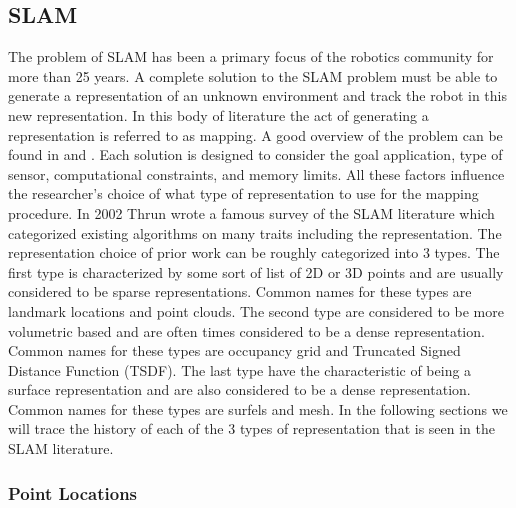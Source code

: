 \subsection{SLAM}

The problem of SLAM has been a primary focus of the robotics community for
more than 25 years. A complete solution to the SLAM problem must be able to
generate a representation of an unknown environment and track the robot in
this new representation. In this body of literature the act of generating a
representation is referred to as mapping. A good overview of the problem
can be found in \cite{Durrant-Whyte2006} and \cite{Bailey2006}. Each
solution is designed to consider the goal application, type of sensor,
computational constraints, and memory limits. All these factors influence
the researcher's choice of what type of representation to use for the
mapping procedure. In 2002 Thrun wrote a famous survey \cite{Thrun2002} of
the SLAM literature which categorized existing algorithms on many traits
including the representation. The representation choice of prior work can
be roughly categorized into 3 types. The first type is characterized by
some sort of list of 2D or 3D points and are usually considered to be
sparse representations. Common names for these types are landmark locations
and point clouds. The second type are considered to be more volumetric
based and are often times considered to be a dense representation. Common
names for these types are occupancy grid and Truncated Signed Distance
Function (TSDF). The last type have the characteristic of being a surface
representation and are also considered to be a dense representation. Common
names for these types are surfels and mesh. In the following sections we
will trace the history of each of the 3 types of representation that is
seen in the SLAM literature.

\subsubsection{Point Locations}

